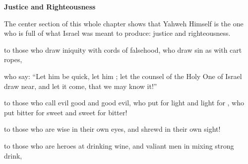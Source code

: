 \documentclass[11pt]{article}
\begin{document}
\vspace{3em}
{\large\bfseries Justice and Righteousness}
\vspace{1em}

The center section of this whole chapter shows that Yahweh Himself is the one who is full of what Israel was meant to produce: justice and righteousness. 


\begin{biblicaloutline}[Isaiah 5:18-25 (B')]
    

    \begin{versesection}{2em}
          to those who draw iniquity with cords of falsehood,
        \poetryline who draw sin as with cart ropes,
        
         who say: ``Let him be quick,
        \poetryline let him 
        \poetryline {};
        let the counsel of the Holy One of Israel draw near,
        \poetryline and let it come, that we may know it!''
    \end{versesection}
    
    
    \begin{versesection}{2em}
          to those who call evil good
        \poetryline and good evil,
        who put  for light
        \poetryline and light for ,
        who put bitter for sweet
        \poetryline and sweet for bitter!
    \end{versesection}
    
    
    \begin{versesection}{2em}
          to those who are wise in their own eyes,
        \poetryline and shrewd in their own sight!
    \end{versesection}
    
    
    \begin{versesection}{2em}
          to those who are heroes at drinking wine,
        \poetryline and valiant men in mixing strong drink,
        

\end{versesection}
\end{biblicaloutline}
\end{document}
